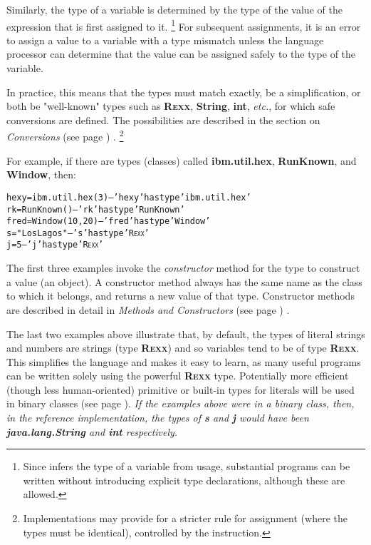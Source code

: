 Similarly, the type of a \nr{} variable is determined by the type of
the value of the expression that is first assigned to it.
\footnote{
Since \nr{} infers the type of a variable from usage, substantial
programs can be written without introducing explicit type
declarations, although these are allowed.
}
For subsequent assignments, it is an error to assign a value to a
variable with a type mismatch unless the language processor can
determine that the value can be assigned safely to the type of the
variable.
 
In practice, this means that the types must match exactly, be a
simplification, or both be "well-known" types such
as \textbf{R\textsc{exx}}, \textbf{String}, \textbf{int}, \emph{etc.}, for which
safe conversions are defined.  The possibilities are described in the
section on  \emph{Conversions} (see page \pageref{refconv}) .
\footnote{
Implementations may provide for a stricter rule for assignment (where
the types must be identical), controlled by the 
instruction.
}
 
For example, if there are types (classes)
called \textbf{ibm.util.hex}, \textbf{RunKnown},
and \textbf{Window}, then:
\begin{alltt}
hexy=ibm.util.hex(3) -- 'hexy' has type 'ibm.util.hex'
rk=RunKnown()        -- 'rk' has type 'RunKnown'
fred=Window(10, 20)  -- 'fred' has type 'Window'
s="Los Lagos"        -- 's' has type 'R\textsc{exx}'
j=5                  -- 'j' has type 'R\textsc{exx}'
\end{alltt}
 
The first three examples invoke the \emph{constructor} method for the
type to construct a value (an object).  A constructor method always has
the same name as the class to which it belongs, and returns a new value
of that type.  Constructor methods are described in detail in
 \emph{Methods and Constructors} (see page \pageref{refmethcon}) .
 
The last two examples above illustrate that, by default, the types of
literal strings and numbers are \nr{} strings (type \textbf{R\textsc{exx}})
and so variables tend to be of type \textbf{R\textsc{exx}}.
This simplifies the language and makes it easy to learn, as many useful
programs can be written solely using the powerful \textbf{R\textsc{exx}} type.
Potentially more efficient (though less human-oriented) primitive
or built-in types for literals will be used in  binary classes (see page \pageref{refbincla}).
 \emph{If the examples above were in a binary class, then, in the
reference implementation, the types of \textbf{s} and \textbf{j}
would have been \textbf{java.lang.String} and \textbf{int}
respectively.
}
 
